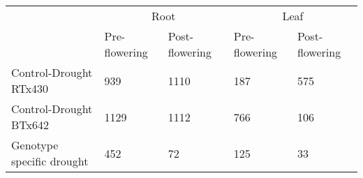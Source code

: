 \begin{tabular}{lllll}
\toprule
{} & \multicolumn{2}{c}{Root} & \multicolumn{2}{c}{Leaf} \\
{} & Pre-flowering & Post-flowering & Pre-flowering & Post-flowering \\
\midrule
Control-Drought RTx430    &           939 &           1110 &           187 &            575 \\
Control-Drought BTx642    &          1129 &           1112 &           766 &            106 \\
Genotype specific drought &           452 &             72 &           125 &             33 \\
\bottomrule
\end{tabular}
